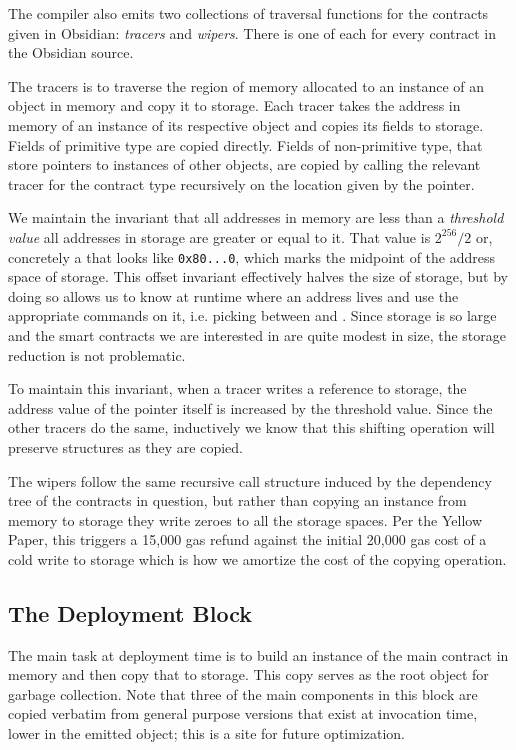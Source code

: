 The compiler also emits two collections of traversal functions for the
contracts given in Obsidian: \emph{tracers} and \emph{wipers}. There is one
of each for every contract in the Obsidian source.

The tracers is to traverse the region of memory allocated to an instance of
an object in memory and copy it to storage. Each tracer takes the address
in memory of an instance of its respective object and copies its fields to
storage. Fields of primitive type are copied directly. Fields of
non-primitive type, that store pointers to instances of other objects, are
copied by calling the relevant tracer for the contract type recursively on
the location given by the pointer.

We maintain the invariant that all addresses in memory are less than
a \emph{threshold value} all addresses in storage are greater or equal to
it. That value is $2^{256}/2$ or, concretely a  that looks
like \texttt{0x80...0}, which marks the midpoint of the address space of
storage. This offset invariant effectively halves the size of storage, but
by doing so allows us to know at runtime where an address lives and use the
appropriate commands on it, i.e. picking between 
and . Since storage is so large and the smart contracts we
are interested in are quite modest in size, the storage reduction is not
problematic.

To maintain this invariant, when a tracer writes a reference to storage,
the address value of the pointer itself is increased by the threshold
value. Since the other tracers do the same, inductively we know that this
shifting operation will preserve structures as they are copied.

The wipers follow the same recursive call structure induced by the
dependency tree of the contracts in question, but rather than copying an
instance from memory to storage they write zeroes to all the storage
spaces. Per the Yellow Paper, this triggers a 15,000 gas refund against the
initial 20,000 gas cost of a cold write to storage which is how we amortize
the cost of the copying operation. \cite{TODO}


\subsection{The Deployment Block}

The main task at deployment time is to build an instance of the main
contract in memory and then copy that to storage. This copy serves as the
root object for garbage collection. Note that three of the main components
in this block are copied verbatim from general purpose versions that exist
at invocation time, lower in the emitted object; this is a site for future
optimization.


